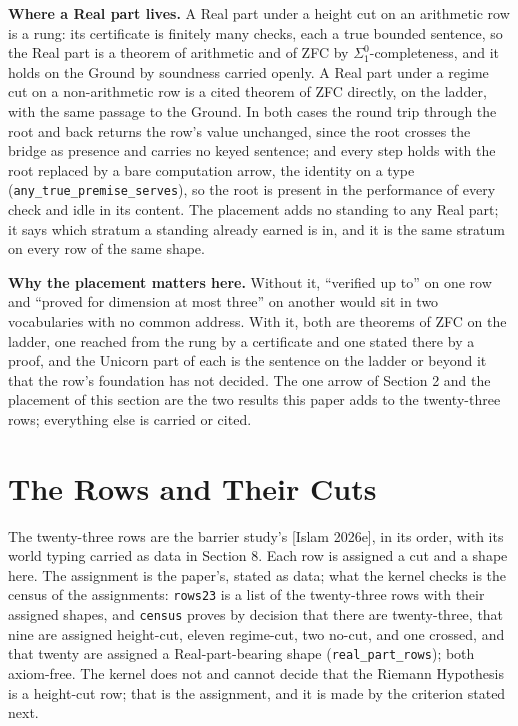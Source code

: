 \documentclass[10pt]{article}
\begin{document}
\textbf{Where a Real part lives.} A Real part under a height cut on an
arithmetic row is a rung: its certificate is finitely many checks, each
a true bounded sentence, so the Real part is a theorem of arithmetic and
of ZFC by \(\Sigma^0_1\)-completeness, and it holds on the Ground by
soundness carried openly. A Real part under a regime cut on a
non-arithmetic row is a cited theorem of ZFC directly, on the ladder,
with the same passage to the Ground. In both cases the round trip
through the root and back returns the row's value unchanged, since the
root crosses the bridge as presence and carries no keyed sentence; and
every step holds with the root replaced by a bare computation arrow, the
identity on a type (\texttt{any\_true\_premise\_serves}), so the root is
present in the performance of every check and idle in its content. The
placement adds no standing to any Real part; it says which stratum a
standing already earned is in, and it is the same stratum on every row
of the same shape.

\textbf{Why the placement matters here.} Without it, ``verified up to''
on one row and ``proved for dimension at most three'' on another would
sit in two vocabularies with no common address. With it, both are
theorems of ZFC on the ladder, one reached from the rung by a
certificate and one stated there by a proof, and the Unicorn part of
each is the sentence on the ladder or beyond it that the row's
foundation has not decided. The one arrow of Section 2 and the placement
of this section are the two results this paper adds to the twenty-three
rows; everything else is carried or cited.

\hypertarget{the-rows-and-their-cuts}{%
\section{The Rows and Their Cuts}\label{the-rows-and-their-cuts}}

The twenty-three rows are the barrier study's {[}Islam 2026e{]}, in its
order, with its world typing carried as data in Section 8. Each row is
assigned a cut and a shape here. The assignment is the paper's, stated
as data; what the kernel checks is the census of the assignments:
\texttt{rows23} is a list of the twenty-three rows with their assigned
shapes, and \texttt{census} proves by decision that there are
twenty-three, that nine are assigned height-cut, eleven regime-cut, two
no-cut, and one crossed, and that twenty are assigned a
Real-part-bearing shape (\texttt{real\_part\_rows}); both axiom-free.
The kernel does not and cannot decide that the Riemann Hypothesis is a
height-cut row; that is the assignment, and it is made by the criterion
stated next.
\end{document}
